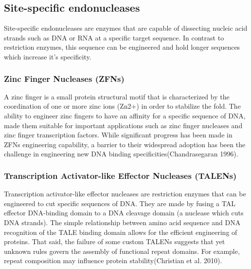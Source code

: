 \documentclass[
]{article}
\begin{document}
\hypertarget{site-specific-endonucleases}{%
\subsection{Site-specific
endonucleases}\label{site-specific-endonucleases}}

Site-specific endonucleases are enzymes that are capable of dissecting
nucleic acid strands such as DNA or RNA at a specific target sequence.
In contrast to restriction enzymes, this sequence can be engineered and
hold longer sequences which increase it's specificity.

\hypertarget{zinc-finger-nucleases-zfns}{%
\subsubsection{Zinc Finger Nucleases
(ZFNs)}\label{zinc-finger-nucleases-zfns}}

A zinc finger is a small protein structural motif that is characterized
by the coordination of one or more zinc ions (Zn2+) in order to
stabilize the fold. The ability to engineer zinc fingers to have an
affinity for a specific sequence of DNA, made them suitable for
important applications such as zinc finger nucleases and zinc finger
transcription factors. While significant progress has been made in ZFNs
engineering capability, a barrier to their widespread adoption has been
the challenge in engineering new DNA binding
specificities(Chandrasegaran 1996).

\hypertarget{transcription-activator-like-effector-nucleases-talens}{%
\subsubsection{Transcription Activator-like Effector Nucleases
(TALENs)}\label{transcription-activator-like-effector-nucleases-talens}}

Transcription activator-like effector nucleases are restriction enzymes
that can be engineered to cut specific sequences of DNA. They are made
by fusing a TAL effector DNA-binding domain to a DNA cleavage domain (a
nuclease which cuts DNA strands). The simple relationship between amino
acid sequence and DNA recognition of the TALE binding domain allows for
the efficient engineering of proteins. That said, the failure of some
custom TALENs suggests that yet unknown rules govern the assembly of
functional repeat domains. For example, repeat composition may influence
protein stability(Christian et al. 2010).
\end{document}
